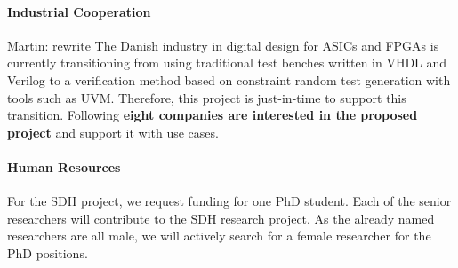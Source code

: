 \documentclass[fleqn,12pt]{article}
\newcommand{\martin}[1]{{\color{blue} Martin: #1}}
\begin{document}
\paragraph*{Industrial Cooperation}

\martin{rewrite}
The Danish industry in digital design for ASICs and FPGAs is currently transitioning from using traditional
test benches written in VHDL and Verilog to a verification method based on constraint random
test generation with tools such as UVM. Therefore, this project is just-in-time to support this
transition.
%
Following {\bf eight companies are interested in the proposed project} and support it with use cases.


%

\paragraph*{Human Resources}

For the SDH project, we request funding for one PhD student.
Each of the senior researchers will contribute to the SDH research project.
%
%
As the already named researchers are all male, we will actively search
for a female researcher for the PhD positions.
\end{document}
